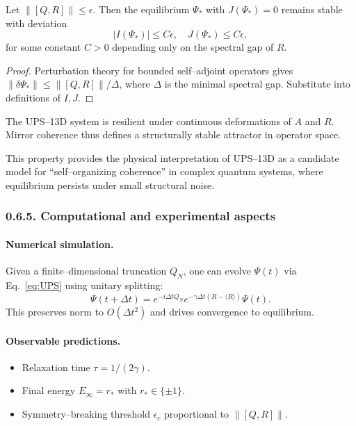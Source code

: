 \begin{theorem}
Let $\|[Q,R]\|\le\epsilon$. Then the equilibrium $\Psi_*$ with $J(\Psi_*)=0$
remains stable with deviation
\[
|I(\Psi_*)|\le C\epsilon,\quad J(\Psi_*)\le C\epsilon,
\]
for some constant $C>0$ depending only on the spectral gap of $R$.
\end{theorem}

\begin{proof}
Perturbation theory for bounded self–adjoint operators gives
$\|\delta \Psi_*\|\le \|[Q,R]\|/\Delta$, where $\Delta$ is the minimal spectral gap.
Substitute into definitions of $I,J$.
\end{proof}

\begin{corollary}
The UPS–13D system is resilient under continuous deformations of $A$ and $R$.
Mirror coherence thus defines a structurally stable attractor in operator space.
\end{corollary}

\begin{remark}
This property provides the physical interpretation of UPS–13D as a candidate model for “self–organizing coherence” in complex quantum systems,
where equilibrium persists under small structural noise.
\end{remark}

\subsubsection*{0.6.5. Computational and experimental aspects}

\paragraph{Numerical simulation.}
Given a finite–dimensional truncation $Q_N$, one can evolve $\Psi(t)$ via Eq.~\eqref{eq:UPS} using unitary splitting:
\[
\Psi(t+\Delta t)=e^{-i\Delta t Q_N}e^{-\gamma\Delta t (R-\langle R\rangle)}\Psi(t).
\]
This preserves norm to $O(\Delta t^2)$ and drives convergence to equilibrium.

\paragraph{Observable predictions.}
\begin{itemize}
  \item Relaxation time $\tau=1/(2\gamma)$.
  \item Final energy $E_\infty=r_*$ with $r_*\in\{\pm1\}$.
  \item Symmetry–breaking threshold $\epsilon_c$ proportional to $\|[Q,R]\|$.
\end{itemize}

